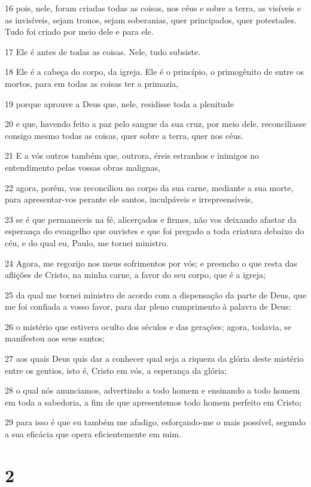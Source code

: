 \par 16 pois, nele, foram criadas todas as coisas, nos céus e sobre a terra, as visíveis e as invisíveis, sejam tronos, sejam soberanias, quer principados, quer potestades. Tudo foi criado por meio dele e para ele.
\par 17 Ele é antes de todas as coisas. Nele, tudo subsiste.
\par 18 Ele é a cabeça do corpo, da igreja. Ele é o princípio, o primogênito de entre os mortos, para em todas as coisas ter a primazia,
\par 19 porque aprouve a Deus que, nele, residisse toda a plenitude
\par 20 e que, havendo feito a paz pelo sangue da sua cruz, por meio dele, reconciliasse consigo mesmo todas as coisas, quer sobre a terra, quer nos céus.
\par 21 E a vós outros também que, outrora, éreis estranhos e inimigos no entendimento pelas vossas obras malignas,
\par 22 agora, porém, vos reconciliou no corpo da sua carne, mediante a sua morte, para apresentar-vos perante ele santos, inculpáveis e irrepreensíveis,
\par 23 se é que permaneceis na fé, alicerçados e firmes, não vos deixando afastar da esperança do evangelho que ouvistes e que foi pregado a toda criatura debaixo do céu, e do qual eu, Paulo, me tornei ministro.
\par 24 Agora, me regozijo nos meus sofrimentos por vós; e preencho o que resta das aflições de Cristo, na minha carne, a favor do seu corpo, que é a igreja;
\par 25 da qual me tornei ministro de acordo com a dispensação da parte de Deus, que me foi confiada a vosso favor, para dar pleno cumprimento à palavra de Deus:
\par 26 o mistério que estivera oculto dos séculos e das gerações; agora, todavia, se manifestou aos seus santos;
\par 27 aos quais Deus quis dar a conhecer qual seja a riqueza da glória deste mistério entre os gentios, isto é, Cristo em vós, a esperança da glória;
\par 28 o qual nós anunciamos, advertindo a todo homem e ensinando a todo homem em toda a sabedoria, a fim de que apresentemos todo homem perfeito em Cristo;
\par 29 para isso é que eu também me afadigo, esforçando-me o mais possível, segundo a sua eficácia que opera eficientemente em mim.

\chapter{2}

